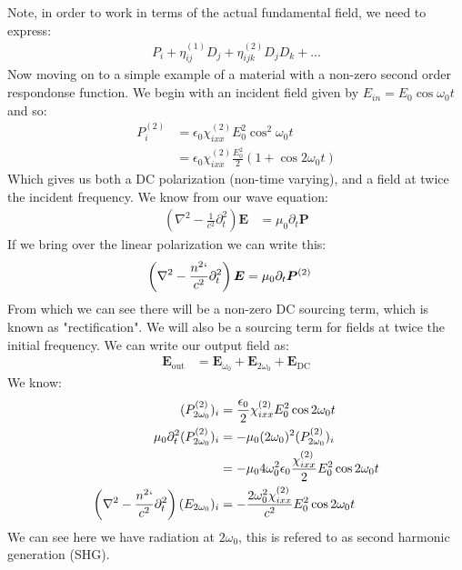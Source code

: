 Note, in order to work in terms of the actual fundamental field, we need to express:
\begin{align*}
	P_i + \eta^{(1)}_{ij} D_j + \eta^{(2)}_{ijk}D_jD_k + \ldots
\end{align*}
Now moving on to a simple example of a material with a non-zero second order respondonse function. We begin with an incident field given by $E_{in} = E_0 \cos\omega_0 t$ and so:
\begin{align*}
	P^{(2)}_i &= \epsilon_0 \chi^{(2)}_{ixx} E_0^2\cos^2\omega_0 t \\
	&= \epsilon_0 \chi^{(2)}_{ixx} \frac{E_0^2}{2}(1+\cos2\omega_0 t)
\end{align*}
Which gives us both a DC polarization (non-time varying), and a field at twice the incident frequency. We know from our wave equation:
\begin{align*}
	\left(\nabla^2 - \frac{1}{c^2} \partial_t^2\right)\bm{E} &= \mu_0 \partial_t \bm{P}
\end{align*}
If we bring over the linear polarization we can write this:
\begin{align*}
	\left(\nabla^2 - \frac{n^2`}{c^2} \partial_t^2\right)\bm{E} &= \mu_0 \partial_t \bm{P}^{(2)}
\end{align*}
From which we can see there will be a non-zero DC sourcing term, which is known as "rectification". We will also be a sourcing term for fields at twice the initial frequency. We can write our output field as:
\begin{align*}
	\bm{E}_\text{out} &= \bm{E}_{\omega_0} +  \bm{E}_{2\omega_0} + \bm{E}_\text{DC}
\end{align*}
We know:
\begin{align*}
	(P^{(2)}_{2\omega_0})_i &= \frac{\epsilon_0}{2}\chi^{(2)}_{ixx} E_0^2\cos2\omega_0t \\
	\mu_0\partial_t^2 (P^{(2)}_{2\omega_0})_i &= -\mu_0(2\omega_0)^2(P^{(2)}_{2\omega_0})_i \\
	&= -\mu_0 4\omega_0^2\epsilon_0\frac{\chi^{(2)}_{ixx}}{2} E_0^2\cos2\omega_0 t \\
	\left(\nabla^2 - \frac{n^2`}{c^2} \partial_t^2\right)(E_{2\omega_0})_i &= -\frac{2\omega_0^2 \chi^{(2)}_{ixx}}{c^2} E_0^2 \cos 2\omega_0 t
\end{align*}
We can see here we have radiation at $2\omega_0$, this is refered to as second harmonic generation (SHG).

